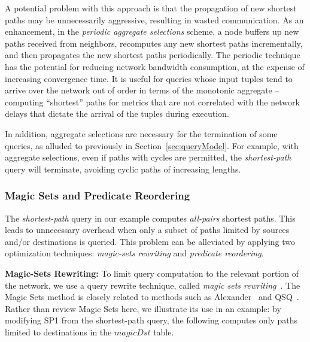 A potential problem with this approach is that the propagation of new
shortest paths may be unnecessarily aggressive, resulting in wasted communication.
As an enhancement, in the {\em periodic aggregate selections} scheme, a node buffers up
new paths received from neighbors, recomputes any new shortest paths
incrementally, and then propagates the new shortest paths
periodically. The periodic technique has the potential for reducing
network bandwidth consumption, at the expense of increasing convergence time.
It is useful for queries whose input tuples tend 
to arrive over the network out of order in terms of the monotonic aggregate --
\eg computing ``shortest'' paths for metrics that are  
not correlated with the network delays that dictate the arrival of the
tuples during execution.

In addition, aggregate selections are necessary for the termination of
some queries, as alluded to previously in
Section~\ref{sec:queryModel}. For example, with aggregate selections,
even if paths with cycles are permitted, the {\em
  shortest-path} query will terminate, avoiding cyclic paths of
  increasing lengths.  


\subsubsection{Magic Sets and Predicate Reordering}
\label{sec:magic}
\label{sec:leftLinear}

The {\em shortest-path} query in our example computes {\em all-pairs} shortest
paths. This leads to unnecessary overhead when only a
subset of paths limited by sources and/or destinations is queried. This
problem can be alleviated by applying two optimization techniques:  {\em
  magic-sets rewriting} and {\em predicate reordering}.

\noindent
{\bf Magic-Sets Rewriting:} To limit query computation to the relevant portion
of the network, we use a query rewrite technique, called {\em
  magic sets rewriting}~\cite{oldMagic}. The Magic Sets method is
closely related to methods such as Alexander~\cite{alexander} and
QSQ~\cite{qsr}. Rather than review Magic Sets here,
we illustrate its use in an example: by modifying SP1 from the
shortest-path query, the following computes only paths limited to destinations
in the $magicDst$ table. 


